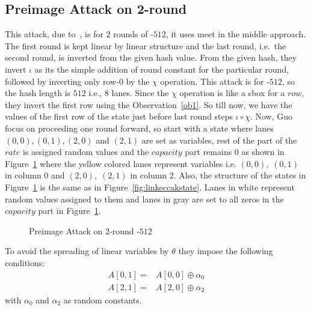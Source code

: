 \subsection{Preimage Attack on 2-round }
\label{section2RKeccak512}
This attack, due to~\cite{guo2016linear}, is for $2$ rounds of \KECCAK-$512$, it uses meet in the middle approach. The first round is kept linear by linear structure and the last round, i.e.\ the second round, is inverted from the given hash value. From the given hash, they invert $\iota$ as its the simple addition of round constant for the particular round, followed by inverting only row-$0$ by the $\chi$ operation. This attack is for \KECCAK-$512$, so the hash length is $512$ i.e., $8$ lanes. Since the $\chi$ operation is like a sbox for a $row$, they invert the first row using the Observation~\ref{ob1}. So till now, we have the values of the first row of the state just before last round steps $\iota \circ \chi$. Now, Guo \etal focus on proceeding one round forward, so start with a state where lanes $(0,0), (0,1), (2,0) $ and $(2,1)$ are set as variables, rest of the part of the $rate$ is assigned random values and the $capacity$ part remains $0$ as shown in Figure~\ref{fig:2rkeccak512} where the yellow colored lanes represent variables i.e. $(0,0),\;(0,1)$ in column $0$ and $(2,0),\;(2,1)$ in column $2$. Also, the structure of the states in Figure~\ref{fig:2rkeccak512} is the same as in Figure~\ref{fig:linkeccakstate}. Lanes in white represent random values assigned to them and lanes in gray are set to all zeros in the $capacity$ part in Figure~\ref{fig:2rkeccak512}.
\begin{figure}
    \centering
    \caption{Preimage Attack on $2$-round \KECCAK-$512$}
    \label{fig:2rkeccak512}
\end{figure}
        To avoid the spreading of linear variables by $\theta$ they impose the following conditions: 
\begin{equation}
\begin{aligned}
	A[0, 1] =& A[0, 0] \oplus \alpha_{0}\\
	A[2, 1] =& A[2, 0] \oplus \alpha_{2}			
\end{aligned}
\end{equation}
        with $\alpha_0$ and $\alpha_2$ as random constants.
        
